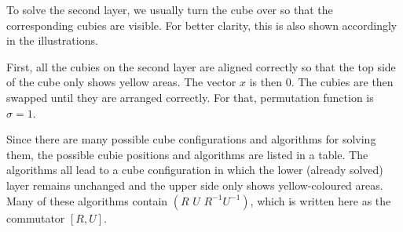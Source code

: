 \documentclass[12pt,a4paper]{article}
\theoremstyle{custom}
\begin{document}
To solve the second layer, we usually turn the cube over so that the corresponding cubies are visible. For better clarity, this is also shown accordingly in the illustrations.

First, all the cubies on the second layer are aligned correctly so that the top side of the cube only shows yellow areas. The vector $x$ is then $0$. The cubies are then swapped until they are arranged correctly. For that, permutation function is $\sigma = 1$.

Since there are many possible cube configurations and algorithms for solving them, the possible cubie positions and algorithms are listed in a table. The algorithms all lead to a cube configuration in which the lower (already solved) layer remains unchanged and the upper side only shows yellow-coloured areas.
Many of these algorithms contain $(\textit{R U R}^{-1} U^{-1})$, which is written here as the commutator $[ R,U ]$. 
\end{document}
